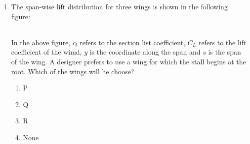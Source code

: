 \documentclass[journal]{IEEEtran}
\begin{document}
\begin{enumerate}
\begin{enumerate}
		\end{enumerate}
	\item The span-wise lift distribution for three wings is shown in the following figure:
		\begin{figure}[h!]
			
		\end{figure}\\
		In the above figure, $c_l$ refers to the section list coefficient, $C_L$ refers to the lift coefficient of the wimd, $y$ is the coordinate along the span and $s$ is the span of the wing. A designer prefers to use a wing for which the stall begins at the root. Which of the wings will he choose?
		\begin{enumerate}
			\item P
			\item Q
			\item R
			\item None
		\end{enumerate}
\end{enumerate}
\end{document}

